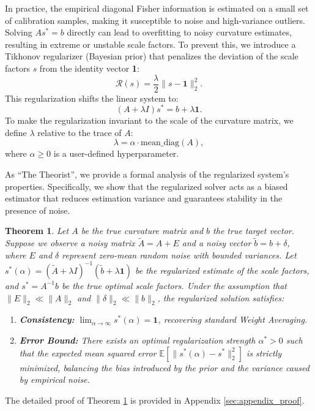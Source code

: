 \documentclass{article}
\theoremstyle{plain}
\newtheorem{theorem}{Theorem}[section]
\theoremstyle{definition}
\theoremstyle{remark}
\begin{document}
In practice, the empirical diagonal Fisher information is estimated on a small set of calibration samples, making it susceptible to noise and high-variance outliers. 
Solving $A s^* = b$ directly can lead to overfitting to noisy curvature estimates, resulting in extreme or unstable scale factors. 
To prevent this, we introduce a Tikhonov regularizer (Bayesian prior) that penalizes the deviation of the scale factors $s$ from the identity vector \textbf{1}:
\begin{equation}
    \mathcal{R}(s) = \frac{\lambda}{2} \|s - \mathbf{1}\|_2^2.
\end{equation}
This regularization shifts the linear system to:
\begin{equation}
    (A + \lambda I) s^* = b + \lambda \mathbf{1}.
    \label{eq:regularized_system}
\end{equation}
To make the regularization invariant to the scale of the curvature matrix, we define $\lambda$ relative to the trace of $A$:
\begin{equation}
    \lambda = \alpha \cdot \text{mean\_diag}(A),
\end{equation}
where $\alpha \ge 0$ is a user-defined hyperparameter.

As ``The Theorist'', we provide a formal analysis of the regularized system's properties. 
Specifically, we show that the regularized solver acts as a biased estimator that reduces estimation variance and guarantees stability in the presence of noise.

\begin{theorem}
Let $A$ be the true curvature matrix and $b$ the true target vector. 
Suppose we observe a noisy matrix $\tilde{A} = A + E$ and a noisy vector $\tilde{b} = b + \delta$, where $E$ and $\delta$ represent zero-mean random noise with bounded variances. 
Let $s^*(\alpha) = (\tilde{A} + \lambda I)^{-1} (\tilde{b} + \lambda \mathbf{1})$ be the regularized estimate of the scale factors, and $s^* = A^{-1} b$ be the true optimal scale factors. 
Under the assumption that $\|E\|_2 \ll \|A\|_2$ and $\|\delta\|_2 \ll \|b\|_2$, the regularized solution satisfies:
\begin{enumerate}
    \item \textbf{Consistency:} $\lim_{\alpha \to \infty} s^*(\alpha) = \mathbf{1}$, recovering standard Weight Averaging.
    \item \textbf{Error Bound:} There exists an optimal regularization strength $\alpha^* > 0$ such that the expected mean squared error $\mathbb{E}[\|s^*(\alpha) - s^*\|_2^2]$ is strictly minimized, balancing the bias introduced by the prior and the variance caused by empirical noise.
\end{enumerate}
\label{thm:regularization}
\end{theorem}
The detailed proof of Theorem \ref{thm:regularization} is provided in Appendix \ref{sec:appendix_proof}.
\end{document}

